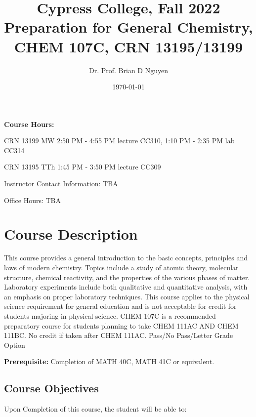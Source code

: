 \documentclass[11pt]{article}
\title{\textbf{Cypress College, Fall 2022 \\
    Preparation for General Chemistry, CHEM 107C, CRN 13195/13199}}
\author{Dr. Prof. Brian D Nguyen}
\date{\today}
\begin{document}
\maketitle 

\textbf{Course Hours:}

CRN 13199 MW 2:50 PM - 4:55 PM lecture CC310, 1:10 PM - 2:35 PM lab CC314

CRN 13195 TTh 1:45 PM - 3:50 PM lecture CC309

Instructor Contact Information: TBA

Office Hours: TBA

\section{Course Description}
This course provides a general introduction to the basic concepts, principles and laws
of modern chemistry. Topics include a study of atomic theory, molecular structure,
chemical reactivity, and the properties of the various phases of matter. Laboratory
experiments include both qualitative and quantitative analysis, with an emphasis on
proper laboratory techniques. This course applies to the physical science requirement
for general education and is not acceptable for credit for students majoring in physical
science. CHEM 107C is a recommended preparatory course for students planning to take
CHEM 111AC AND CHEM 111BC. No credit if taken after CHEM 111AC. Pass/No Pass/Letter
Grade Option

\textbf{Prerequisite:}  Completion of MATH 40C, MATH 41C or equivalent.

\subsection{Course Objectives}
Upon Completion of this course, the student will be able to:
\end{document}
